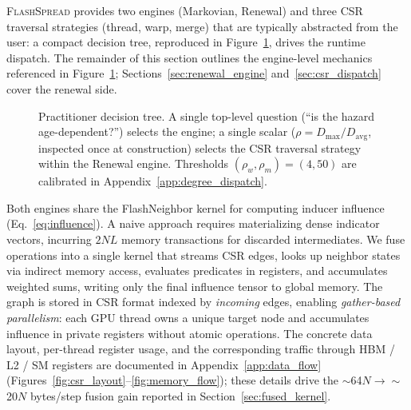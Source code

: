 \documentclass[a4paper,fleqn]{cas-sc}
\theoremstyle{definition}
\theoremstyle{remark}
\newcommand{\flashspread}{\textsc{FlashSpread}}
\begin{document}
\flashspread{} provides two engines (Markovian, Renewal) and three CSR traversal strategies (thread, warp, merge) that are typically abstracted from the user: a compact decision tree, reproduced in Figure~\ref{fig:decision_tree}, drives the runtime dispatch. The remainder of this section outlines the engine-level mechanics referenced in Figure~\ref{fig:decision_tree}; Sections~\ref{sec:renewal_engine} and~\ref{sec:csr_dispatch} cover the renewal side.
\begin{figure}[!htbp]
\centering

\caption{Practitioner decision tree. A single top-level question (``is the hazard age-dependent?'') selects the engine; a single scalar ($\rho = D_{\max}/D_{\mathrm{avg}}$, inspected once at construction) selects the CSR traversal strategy within the Renewal engine. Thresholds $(\rho_w, \rho_m) = (4, 50)$ are calibrated in Appendix~\ref{app:degree_dispatch}.}
\label{fig:decision_tree}
\end{figure}
Both engines share the FlashNeighbor kernel\label{sec:flash_neighbor} for computing inducer influence (Eq.~\ref{eq:influence}). A naive approach requires materializing dense indicator vectors, incurring $2NL$ memory transactions for discarded intermediates. We fuse operations into a single kernel that streams CSR edges, looks up neighbor states via indirect memory access, evaluates predicates in registers, and accumulates weighted sums, writing only the final influence tensor to global memory. The graph is stored in CSR format indexed by \emph{incoming} edges, enabling \emph{gather-based parallelism}: each GPU thread owns a unique target node and accumulates influence in private registers without atomic operations. The concrete data layout, per-thread register usage, and the corresponding traffic through HBM / L2 / SM registers are documented in Appendix~\ref{app:data_flow} (Figures~\ref{fig:csr_layout}--\ref{fig:memory_flow}); these details drive the $\sim$64$N \to \sim$20$N$ bytes/step fusion gain reported in Section~\ref{sec:fused_kernel}.
\end{document}

